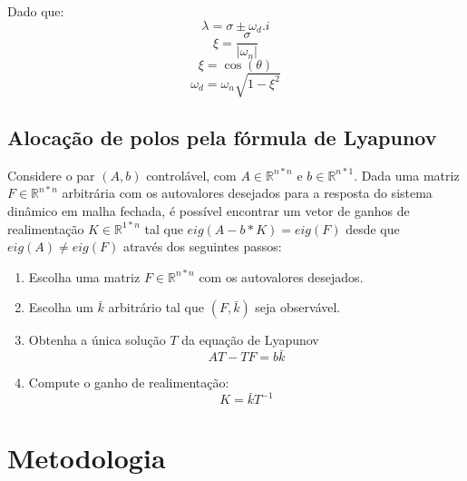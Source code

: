 \documentclass[a4paper]{ifacconf}
\begin{document}
    Dado que:
    \begin{equation} \label{eq:eign}
            \lambda = \sigma \pm \omega_d.i
    \end{equation}
    \begin{equation} \label{eq:xi}
        \xi=\frac{\sigma}{|\omega_n|}
    \end{equation}
    \begin{equation} \label{eq:theta}
            \xi=\cos{(\theta)}
    \end{equation}
    \begin{equation} \label{eq:wd}
            \omega_d=\omega_n\sqrt{1-\xi^2}
    \end{equation}
    
    \subsection{Alocação de polos pela fórmula de Lyapunov} \label{sc:lyapunov}
    
    Considere o par $(A,b)$ controlável, com $A \in \mathbb{R}^{n*n}$ e $b \in \mathbb{R}^{n*1}$. Dada uma matriz $F \in \mathbb{R}^{n*n}$ arbitrária com os autovalores desejados para a resposta do sistema dinâmico em malha fechada, é possível encontrar um vetor de ganhos de realimentação $K\in \mathbb{R}^{1*n}$ tal que $eig(A-b*K)=eig(F)$ desde que $eig(A)\neq eig(F)$ através dos seguintes passos:
    
    \begin{enumerate}
        \item Escolha uma matriz $F \in \mathbb{R}^{n*n}$ com os autovalores desejados.
        \item Escolha um $\bar{k}$ arbitrário tal que $(F,\bar{k})$ seja observável.
        \item {Obtenha a única solução $T$ da equação de Lyapunov
        \begin{equation} \label{eq:lyapunov}
            AT-TF=b\bar{k}
        \end{equation}}
        \item {Compute o ganho de realimentação:
        \begin{equation} \label{eq:ganho}
            K=\bar{k}T^{-1}
        \end{equation}}
    \end{enumerate}
    
    \section{Metodologia}
\end{document}
